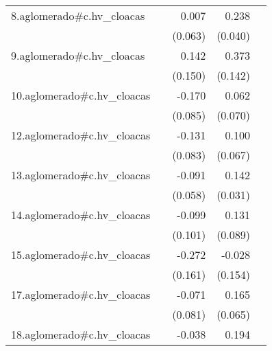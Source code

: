 {\begin{longtable}{l*{4}{D{.}{.}{-1}}}
\addlinespace
8.aglomerado#c.hv\_cloacas&                     &       0.007         &       0.238\sym{***}&                     \\
            &                     &     (0.063)         &     (0.040)         &                     \\
\addlinespace
9.aglomerado#c.hv\_cloacas&                     &       0.142         &       0.373\sym{**} &                     \\
            &                     &     (0.150)         &     (0.142)         &                     \\
\addlinespace
10.aglomerado#c.hv\_cloacas&                     &      -0.170\sym{*}  &       0.062         &                     \\
            &                     &     (0.085)         &     (0.070)         &                     \\
\addlinespace
12.aglomerado#c.hv\_cloacas&                     &      -0.131         &       0.100         &                     \\
            &                     &     (0.083)         &     (0.067)         &                     \\
\addlinespace
13.aglomerado#c.hv\_cloacas&                     &      -0.091         &       0.142\sym{***}&                     \\
            &                     &     (0.058)         &     (0.031)         &                     \\
\addlinespace
14.aglomerado#c.hv\_cloacas&                     &      -0.099         &       0.131         &                     \\
            &                     &     (0.101)         &     (0.089)         &                     \\
\addlinespace
15.aglomerado#c.hv\_cloacas&                     &      -0.272         &      -0.028         &                     \\
            &                     &     (0.161)         &     (0.154)         &                     \\
\addlinespace
17.aglomerado#c.hv\_cloacas&                     &      -0.071         &       0.165\sym{*}  &                     \\
            &                     &     (0.081)         &     (0.065)         &                     \\
\addlinespace
18.aglomerado#c.hv\_cloacas&                     &      -0.038         &       0.194\sym{***}&                     \\

\end{longtable}}

